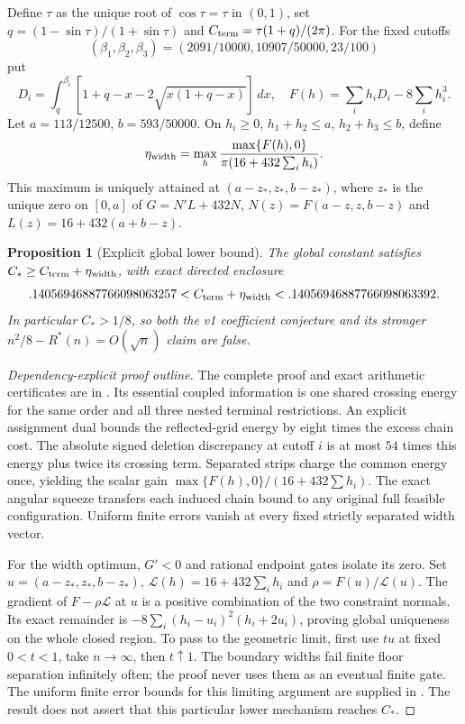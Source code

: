 \documentclass[11pt]{article}
\newtheorem{proposition}[theorem]{Proposition}
\theoremstyle{definition}\newtheorem{definition}[theorem]{Definition}
\theoremstyle{remark}\newtheorem{remark}[theorem]{Remark}
\newcommand{\Rstar}{R^\ast}
\newcommand{\CC}{C_\ast}
\begin{document}
Define $\tau$ as the unique root of $\cos\tau=\tau$ in $(0,1)$, set
$q=(1-\sin\tau)/(1+\sin\tau)$ and
$C_{\rm term}=\tau(1+q)/(2\pi)$.
For the fixed cutoffs
\[
 (\beta_1,\beta_2,\beta_3)=(2091/10000,10907/50000,23/100)
\]
put
\[
 D_i=\int_q^{\beta_i}[1+q-x-2\sqrt{x(1+q-x)}]\,dx,
 \quad F(h)=\sum_i h_iD_i-8\sum_i h_i^3.
\]
Let $a=113/12500$, $b=593/50000$. On
$h_i\ge0$, $h_1+h_2\le a$, $h_2+h_3\le b$, define
\[
 \eta_{\rm width}=\max_h
 \frac{\max\{F(h),0\}}{\pi(16+432\sum_i h_i)}.
\]
This maximum is uniquely attained at $(a-z_*,z_*,b-z_*)$, where $z_*$
is the unique zero on $[0,a]$ of $G=N'L+432N$,
$N(z)=F(a-z,z,b-z)$ and $L(z)=16+432(a+b-z)$.

\begin{proposition}[Explicit global lower bound]\label{prop:lower}
The global constant satisfies $\CC\ge C_{\rm term}+\eta_{\rm width}$,
with exact directed enclosure
\[
 .14056946887766098063257
 < C_{\rm term}+\eta_{\rm width}
 < .14056946887766098063392.
\]
In particular $\CC>1/8$, so both the v1 coefficient conjecture and its
stronger $n^2/8-\Rstar(n)=O(\sqrt n)$ claim are false.
\end{proposition}
\begin{proof}[Dependency-explicit proof outline]
The complete proof and exact arithmetic certificates are in \cite{lower}.
Its essential coupled information is one shared crossing energy for the
same order and all three nested terminal restrictions. An explicit assignment
dual bounds the reflected-grid energy by eight times the excess chain cost.
The absolute signed deletion discrepancy at cutoff $i$ is at most $54$
times this energy plus twice its crossing term. Separated strips charge
the common energy once, yielding
the scalar gain $\max\{F(h),0\}/(16+432\sum h_i)$.
The exact angular squeeze transfers each induced chain bound to any original
full feasible configuration. Uniform finite errors vanish at every fixed
strictly separated width vector.

For the width optimum, $G'<0$ and rational endpoint gates isolate its zero.
Set $u=(a-z_*,z_*,b-z_*)$, $\mathcal L(h)=16+432\sum_i h_i$ and
$\rho=F(u)/\mathcal L(u)$. The gradient of $F-\rho\mathcal L$ at $u$ is a positive
combination of the two constraint normals. Its exact remainder is
$-8\sum_i(h_i-u_i)^2(h_i+2u_i)$, proving global uniqueness on the whole
closed region. To pass to the geometric limit, first use $tu$ at fixed
$0<t<1$, take $n\to\infty$, then $t\uparrow1$. The boundary
widths fail finite floor separation infinitely often; the proof never uses
them as an eventual finite gate. The uniform finite error bounds for this
limiting argument are supplied in \cite{lower}. The result does not assert
that this particular lower mechanism reaches $\CC$.
\end{proof}
\end{document}
